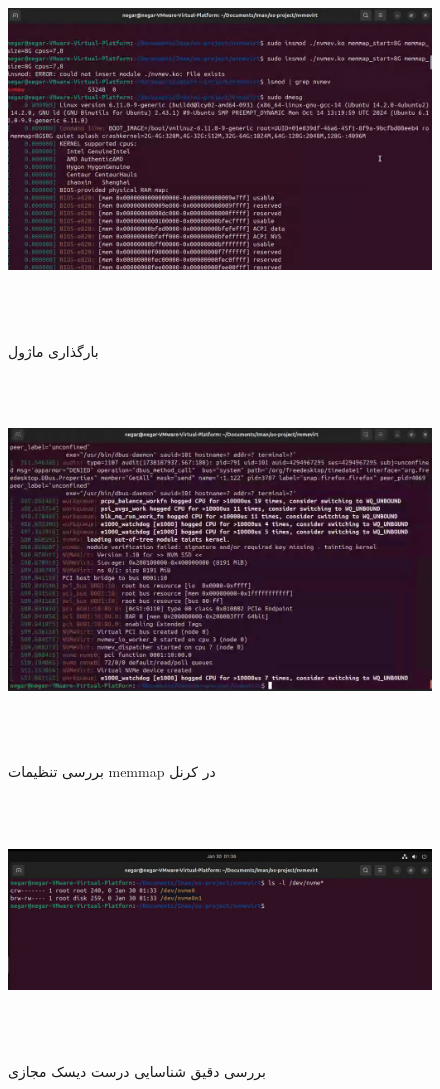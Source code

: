 ‫
‫\begin{figure}[H]
‫	‫    \centering
‫	‫    \includegraphics[width=\textwidth]{figs/14.jpg}
‫	‫    \caption{بارگذاری ماژول}
‫\end{figure}
‫
‫\begin{figure}[H]
‫	‫    \centering
‫	‫    \includegraphics[width=\textwidth]{figs/15.jpg}
‫	‫    \caption{بررسی تنظیمات memmap در کرنل}
‫\end{figure}
‫
‫‫‫\begin{figure}[H]
‫	‫	‫	‫    \centering
‫	‫	‫	‫    \includegraphics[width=\textwidth]{figs/16.jpg}
‫			\caption{بررسی دقیق شناسایی درست دیسک مجازی}
‫\end{figure}
